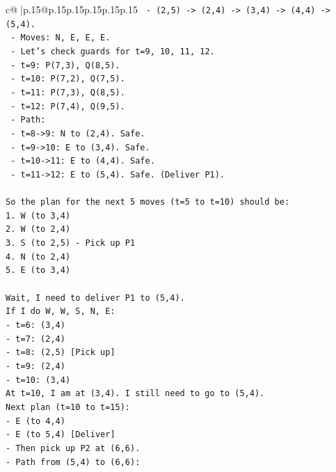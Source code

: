 \documentclass{article}
\begin{document}
{\begin{supertabular}{c@{$\;$}|p{.15\linewidth}@{}p{.15\linewidth}p{.15\linewidth}p{.15\linewidth}p{.15\linewidth}p{.15\linewidth}}
{{{\texttt{    {-} (2,5) {-}> (2,4) {-}> (3,4) {-}> (4,4) {-}> (5,4).} \\
\texttt{    {-} Moves: N, E, E, E.} \\
\texttt{    {-} Let's check guards for t=9, 10, 11, 12.} \\
\texttt{      {-} t=9: P(7,3), Q(8,5).} \\
\texttt{      {-} t=10: P(7,2), Q(7,5).} \\
\texttt{      {-} t=11: P(7,3), Q(8,5).} \\
\texttt{      {-} t=12: P(7,4), Q(9,5).} \\
\texttt{    {-} Path:} \\
\texttt{      {-} t=8{-}>9: N to (2,4). Safe.} \\
\texttt{      {-} t=9{-}>10: E to (3,4). Safe.} \\
\texttt{      {-} t=10{-}>11: E to (4,4). Safe.} \\
\texttt{      {-} t=11{-}>12: E to (5,4). Safe. (Deliver P1).} \\
\\ 
\texttt{So the plan for the next 5 moves (t=5 to t=10) should be:} \\
\texttt{1. W (to 3,4)} \\
\texttt{2. W (to 2,4)} \\
\texttt{3. S (to 2,5) {-} Pick up P1} \\
\texttt{4. N (to 2,4)} \\
\texttt{5. E (to 3,4)} \\
\\ 
\texttt{Wait, I need to deliver P1 to (5,4).} \\
\texttt{If I do W, W, S, N, E:} \\
\texttt{{-} t=6: (3,4)} \\
\texttt{{-} t=7: (2,4)} \\
\texttt{{-} t=8: (2,5) {[}Pick up{]}} \\
\texttt{{-} t=9: (2,4)} \\
\texttt{{-} t=10: (3,4)} \\
\texttt{At t=10, I am at (3,4). I still need to go to (5,4).} \\
\texttt{Next plan (t=10 to t=15):} \\
\texttt{{-} E (to 4,4)} \\
\texttt{{-} E (to 5,4) {[}Deliver{]}} \\
\texttt{{-} Then pick up P2 at (6,6).} \\
\texttt{{-} Path from (5,4) to (6,6):} \\
}}}
\end{supertabular}}
\end{document}
